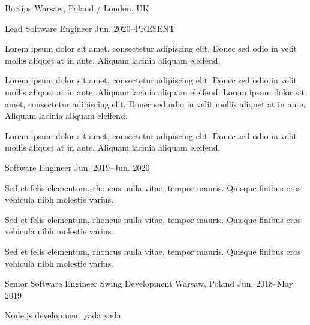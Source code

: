 
\begin{cventries}

  \multicventry
    {Boclips} %
    {Warsaw, Poland / London, UK} %
    {
      \multicventryitem
        {Lead Software Engineer} %
        {Jun. 2020–PRESENT} %
        {
          \begin{cvitems} %
            \item {Lorem ipsum dolor sit amet, consectetur adipiscing elit. Donec sed odio in velit mollis aliquet at in ante. Aliquam lacinia aliquam eleifend.}
            \item {Lorem ipsum dolor sit amet, consectetur adipiscing elit. Donec sed odio in velit mollis aliquet at in ante. Aliquam lacinia aliquam eleifend. Lorem ipsum dolor sit amet, consectetur adipiscing elit. Donec sed odio in velit mollis aliquet at in ante. Aliquam lacinia aliquam eleifend.}
            \item {Lorem ipsum dolor sit amet, consectetur adipiscing elit. Donec sed odio in velit mollis aliquet at in ante. Aliquam lacinia aliquam eleifend.}
          \end{cvitems}
        }
      \multicventryitem
        {Software Engineer} %
        {Jun. 2019–Jun. 2020} %
        {
          \begin{cvitems} %
            \item {Sed et felis elementum, rhoncus nulla vitae, tempor mauris. Quisque finibus eros vehicula nibh molestie varius.}
            \item {Sed et felis elementum, rhoncus nulla vitae, tempor mauris. Quisque finibus eros vehicula nibh molestie varius.}
            \item {Sed et felis elementum, rhoncus nulla vitae, tempor mauris. Quisque finibus eros vehicula nibh molestie varius.}
          \end{cvitems}
        }
    }

  \cventry
    {Senior Software Engineer} %
    {Swing Development} %
    {Warsaw, Poland} %
    {Jun. 2018–May 2019} %
    {
      \begin{cvitems} %
        \item {Node.js development yada yada.}
      \end{cvitems}
    }


\end{cventries}
